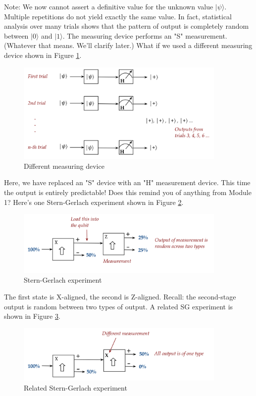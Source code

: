 \documentclass[main.tex]{subfiles}
\begin{document}
    Note: We now cannot assert a definitive value for the unknown value $|\psi\rangle$. Multiple repetitions do not yield exactly the same value. In fact, statistical analysis over many trials shows that the pattern of output is completely random between $|0\rangle$ and $|1\rangle$. The measuring device performs an "S" measurement. (Whatever that means. We'll clarify later.) What if we used a different measuring device shown in Figure \ref{fig:06qubit2}.
    
    \begin{figure}
        \centering
        \includegraphics[width=4in]{notes/figs/n05/06qubit2.png}
        \caption{Different measuring device}
        \label{fig:06qubit2}
    \end{figure}
    
    Here, we have replaced an "S" device with an "H" measurement device. This time the output is entirely predictable! Does this remind you of anything from Module 1? Here's one Stern-Gerlach experiment shown in Figure \ref{fig:07sg1}.
    
    \begin{figure}
        \centering
        \includegraphics[width=4in]{notes/figs/n05/07sg1.png}
        \caption{Stern-Gerlach experiment}
        \label{fig:07sg1}
    \end{figure}
    
    The first state is X-aligned, the second is Z-aligned. Recall: the second-stage output is random between two types of output. A related SG experiment is shown in Figure \ref{fig:08sg2}.
    
    \begin{figure}
        \centering
        \includegraphics[width=4in]{notes/figs/n05/08sg2.png}
        \caption{Related Stern-Gerlach experiment}
        \label{fig:08sg2}
    \end{figure}
    
\end{document}
